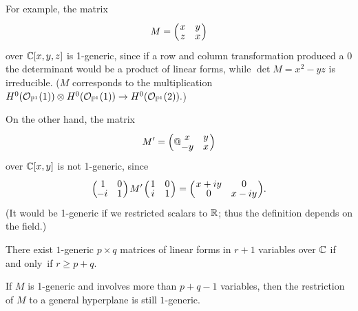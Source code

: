 \begin{example}
For example, the matrix
$$
M = \Bigl(\,\begin{matrix}
x &y\\[-2pt]
z&x
\end{matrix}\,
\Bigr)
$$
over $\CC[x,y,z]$ is  1-generic, since if a row and column transformation
produced a 0 the determinant would be a product of linear forms, while
$\det M = x^2-yz$ is irreducible. ($M$ corresponds to the
multiplication
$H^{0}(\sO_{\PP^{1}}(1)) \otimes
H^{0}(\sO_{\PP^{1}}(1))
\to H^{0}(\sO_{\PP^{1}}(2)).
$)

On the other hand, the matrix
$$
M' = \Bigl(@\begin{matrix}
x &y\\[-2pt]
-y&x
\end{matrix}\,\Bigr)
$$
over $\CC[x,y]$ is not 1-generic, since
$$
\Bigl(\,
\begin{matrix}
1&0\\[-2pt]
\!-i&1
\end{matrix}
\,\Bigr)
\,
M'
\,
\Bigl(\,
\begin{matrix}
1&0\\[-2pt]
i&1
\end{matrix}
\,\Bigr)
=
\Bigl(\,
\begin{matrix}
x+iy&0\\[-2pt]
0&x-iy
\end{matrix}
\,\Bigr)
.
$$
(It would be 1-generic if we restricted scalars to
$\RR$; thus the definition depends on the field.)
\end{example}

\begin{lemma}\label{existence of 1-generic}\label{variables needed}
\label{size of 1-generic} There exist $1$-generic $p\times q$ matrices of
linear forms in $r+1$ variables over $\CC$ if and only~if $r\geq p+q$.

If $M$ is 1-generic and involves more than $p+q-1$ variables, then the
restriction of $M$ to a general hyperplane is still $1$-generic.
\unif
\end{lemma}

